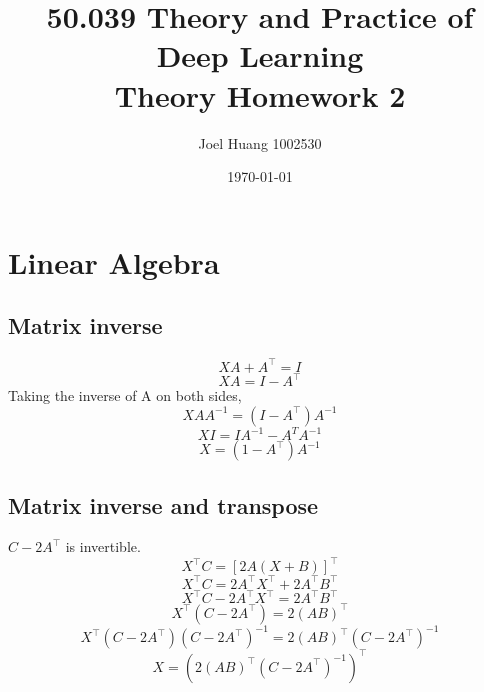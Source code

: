 \documentclass[9pt,twocolumn]{article}
\title{
	50.039 Theory and Practice of Deep Learning\\
	Theory Homework 2
}
\author{Joel Huang 1002530}
\date{\today}
\begin{document}
\maketitle

\section{Linear Algebra}
\subsection*{Matrix inverse}
\begin{equation*}
	XA+A^{\top} = I
\end{equation*}
\begin{equation*}
	XA = I - A^{\top}
\end{equation*}
Taking the inverse of A on both sides,
\begin{equation*}
	XAA^{-1} = (I-A^{\top})A^{-1}
\end{equation*}
\begin{equation*}
	XI = IA^{-1}-A^{T}A^{-1}
\end{equation*}
\begin{equation*}
	X = (1-A^{\top})A^{-1}
\end{equation*}

\subsection*{Matrix inverse and transpose}
$C-2A^{\top}$ is invertible.
\begin{equation*}
	X^{\top}C = [2A(X+B)]^{\top}
\end{equation*}
\begin{equation*}
	X^{\top}C = 2A^{\top}X^{\top}+2A^{\top}B^{\top}
\end{equation*}
\begin{equation*}
	X^{\top}C - 2A^{\top}X^{\top} = 2A^{\top}B^{\top}
\end{equation*}
\begin{equation*}
	X^{\top}(C - 2A^{\top}) = 2(AB)^{\top}
\end{equation*}
\begin{equation*}
	X^{\top}(C - 2A^{\top})(C - 2A^{\top})^{-1} = 2(AB)^{\top}(C - 2A^{\top})^{-1}
\end{equation*}
\begin{equation*}
	X = (2(AB)^{\top}(C - 2A^{\top})^{-1})^{\top}
\end{equation*}
\end{document}
